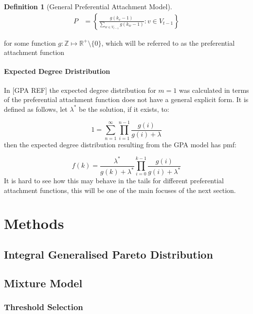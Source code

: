 \documentclass[
  10pt,
  a4paper,
]{scrreprt}
\theoremstyle{definition}
\newtheorem{definition}{Definition}[section]
\theoremstyle{plain}
\theoremstyle{remark}
\begin{document}
{\begin{definition}[General Preferential Attachment
Model]
\begin{align*}
P &= \left\{\frac{g(k_v-1)}{\sum_{w\in V_{t-1}} g(k_w-1)} : v \in V_{t-1}\right\}
\end{align*}

for some function \(g: \mathbb Z \mapsto \mathbb R^+\setminus\{0\}\),
which will be referred to as the preferential attachment function

\end{definition}

\hypertarget{expected-degree-dristribution}{%
\subsubsection{Expected Degree
Dristribution}\label{expected-degree-dristribution}}

In {[}GPA REF{]} the expected degree distribution for \(m=1\) was
calculated in terms of the preferential attachment function does not
have a general explicit form. It is defined as follows, let
\(\lambda^*\) be the solution, if it exists, to:

\[
1=\sum_{n=1}^\infty \prod_{i=1}^{n-1}\frac{g(i)}{g(i)+\lambda}
\] then the expected degree distribution resulting from the GPA model
has pmf:

\[
f(k) = \frac{\lambda^*}{g(k) + \lambda^*}\prod_{i=0}^{k-1}\frac{g(i)}{g(i)+\lambda^*}
\] It is hard to see how this may behave in the tails for different
preferential attachment functions, this will be one of the main focuses
of the next section.

\hypertarget{sec-meth}{%
\chapter{Methods}\label{sec-meth}}

\hypertarget{integral-generalised-pareto-distribution}{%
\section{Integral Generalised Pareto
Distribution}\label{integral-generalised-pareto-distribution}}

\hypertarget{mixture-model}{%
\section{Mixture Model}\label{mixture-model}}

\hypertarget{threshold-selection}{%
\subsection{Threshold Selection}\label{threshold-selection}}

}
\end{document}
